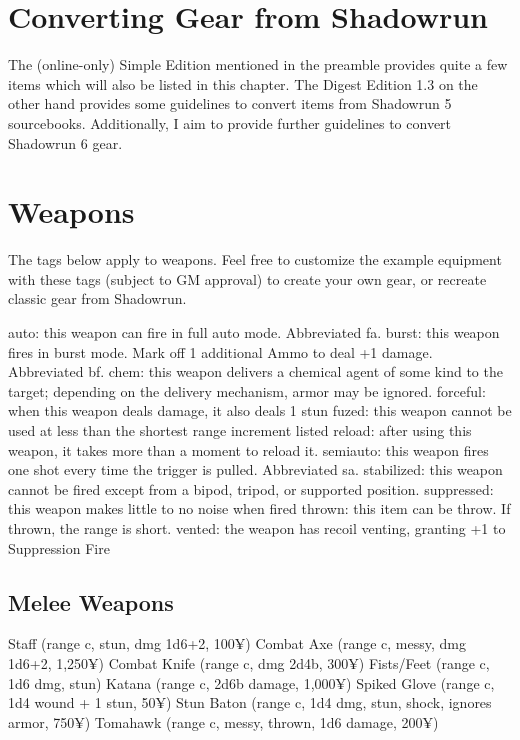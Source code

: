\section{Converting Gear from Shadowrun}

The (online-only) Simple Edition mentioned in the preamble provides quite a few items which will also be listed in this chapter. The Digest Edition 1.3 on the other hand provides some guidelines to convert items from Shadowrun 5 sourcebooks. Additionally, I aim to provide further guidelines to convert Shadowrun 6 gear.



\section{Weapons}

The tags below apply to weapons. Feel free to customize the example equipment with these tags (subject to GM approval) to create your own gear, or recreate classic gear from Shadowrun.

auto: this weapon can fire in full auto mode. Abbreviated fa.
burst: this weapon fires in burst mode. Mark off 1 additional Ammo to deal +1 damage. Abbreviated bf.
chem: this weapon delivers a chemical agent of some kind to the target; depending on the delivery mechanism, armor may be ignored.
forceful: when this weapon deals damage, it also deals 1 stun
fuzed: this weapon cannot be used at less than the shortest range increment listed
reload: after using this weapon, it takes more than a moment to reload it.
semiauto: this weapon fires one shot every time the trigger is pulled. Abbreviated sa.
stabilized: this weapon cannot be fired except from a bipod, tripod, or supported position.
suppressed: this weapon makes little to no noise when fired
thrown: this item can be throw. If thrown, the range is short.
vented: the weapon has recoil venting, granting +1 to Suppression Fire


\subsection{Melee Weapons}

Staff (range c, stun, dmg 1d6+2, 100¥)
Combat Axe (range c, messy, dmg 1d6+2, 1,250¥)
Combat Knife (range c, dmg 2d4b, 300¥)
Fists/Feet (range c, 1d6 dmg, stun)
Katana (range c, 2d6b damage, 1,000¥)
Spiked Glove (range c, 1d4 wound + 1 stun, 50¥)
Stun Baton (range c, 1d4 dmg, stun, shock, ignores armor, 750¥)
Tomahawk (range c, messy, thrown, 1d6 damage, 200¥)


